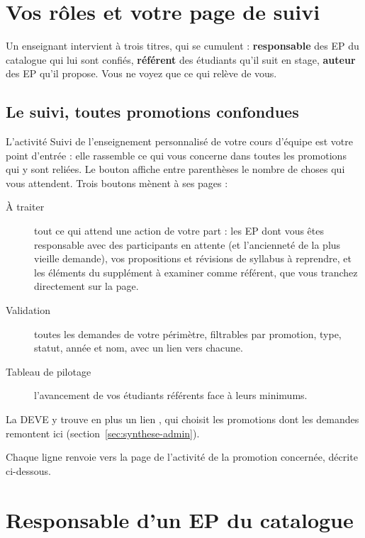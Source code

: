 \documentclass[11pt,a4paper]{article}
\begin{document}
\section{Vos rôles et votre page de suivi}

Un enseignant intervient à trois titres, qui se cumulent : \textbf{responsable} des EP du
catalogue qui lui sont confiés, \textbf{référent} des étudiants qu'il suit en stage,
\textbf{auteur} des EP qu'il propose. Vous ne voyez que ce qui relève de vous.

\subsection{Le suivi, toutes promotions confondues}

L'activité \og Suivi de l'enseignement personnalisé\fg{} de votre cours d'équipe est votre
point d'entrée : elle rassemble ce qui vous concerne dans toutes les promotions qui y sont
reliées. Le bouton  affiche entre parenthèses le nombre de choses qui vous
attendent. Trois boutons mènent à ses pages :
\begin{description}
  \item[À traiter] tout ce qui attend une action de votre part : les EP dont vous êtes
    responsable avec des participants en attente (et l'ancienneté de la plus vieille demande),
    vos propositions et révisions de syllabus à reprendre, et les éléments du supplément à
    examiner comme référent, que vous tranchez directement sur la page.
  \item[Validation] toutes les demandes de votre périmètre, filtrables par promotion, type,
    statut, année et nom, avec un lien vers chacune.
  \item[Tableau de pilotage] l'avancement de vos étudiants référents face à leurs minimums.
\end{description}
La DEVE y trouve en plus un lien , qui choisit les promotions dont les
demandes remontent ici (section~\ref{sec:synthese-admin}).



Chaque ligne renvoie vers la page de l'activité de la promotion concernée, décrite ci-dessous.

\section{Responsable d'un EP du catalogue}\label{sec:responsable}
\end{document}
